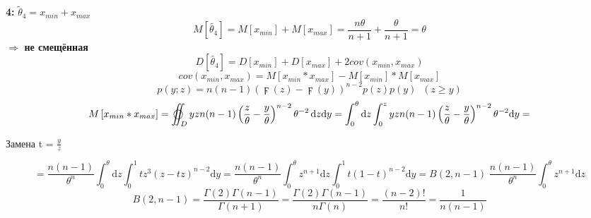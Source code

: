 \textbf{4:}
$\tilde\theta_4 = x_{min} + x_{max}$
\begin{equation*}
    M\left[\tilde{\theta_4}\right] = M\left[x_{min}\right] + M\left[x_{max}\right]
    = \frac{n\theta}{n+1} + \frac{\theta}{n+1} = \theta
\end{equation*}
$\Rightarrow$ \textbf{не смещённая}\\
\begin{equation*}
    D\left[\tilde{\theta_4}\right] = D\left[x_{min}\right] + D\left[x_{max}\right] + 2cov(x_{min}, x_{max})
\end{equation*}
\vspace{1.5mm}
\begin{equation*}
    cov(x_{min}, x_{max}) =  M\left[x_{min}*x_{max}\right] -M\left[x_{min}\right] * M\left[x_{max}\right]
\end{equation*}
\vspace{1.5mm}
\begin{equation*}
    p(y;z) = n(n-1)(\digamma(z) - \digamma(y))^{n-2}p(z)p(y) \;\; (z \geqslant y )
\end{equation*}
\vspace{1.5mm}
\begin{equation*}
    M\left[x_{min}*x_{max}\right] = \varoiint_{D}yzn(n-1)\left(\frac{z}{\theta} - \frac{y}{\theta}\right)^{n-2}\theta^{-2} \,\mathrm{d}z\mathrm{d}y
    = \int_{0}^{\theta}\mathrm{d}z\int_{0}^{z}yzn(n-1)\left(\frac{z}{\theta} - \frac{y}{\theta}\right)^{n-2}\theta^{-2}\mathrm{d}y =
\end{equation*}
\vspace{1.5mm}
\begin{center}
    Замена t = $\frac{y}{z}$
\end{center}
\vspace{1.5mm}
\begin{equation*}  
    = \frac{n(n-1)}{\theta^n}\int_{0}^{\theta}\mathrm{d}z\int_{0}^{1}tz^3\left(z-tz\right)^{n-2}\mathrm{d}y
    = \frac{n(n-1)}{\theta^n}\int_{0}^{\theta}z^{n+1}\mathrm{d}z\int_{0}^{1}t\left(1-t\right)^{n-2}\mathrm{d}y
    = B(2, n-1)\;\frac{n(n-1)}{\theta^n}\int_{0}^{\theta}z^{n+1}\mathrm{d}z
\end{equation*}
\vspace{1.5mm}
\begin{equation*}  
    B(2, n-1) = \frac{\Gamma(2)\Gamma(n-1)}{\Gamma(n+1)} = \frac{\Gamma(2)\Gamma(n-1)}{n\Gamma(n)} = \frac{(n-2)!}{n!}  = \frac{1}{n(n-1)}
\end{equation*}
\vspace{1.5mm}
